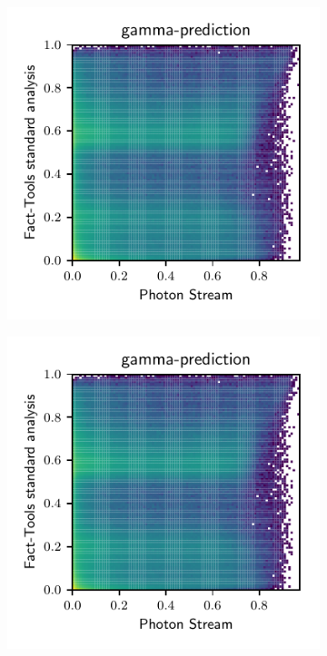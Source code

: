 %
%
\begin{figure}
  \begin{subfigure}{0.5\textwidth}
    \centering
    \includegraphics[width=\textwidth, page=1]{Plots/comparison_data_dl3.pdf}
  \end{subfigure}
  \begin{subfigure}{0.5\textwidth}
    \centering
    \includegraphics[width=\textwidth, page=2]{Plots/comparison_data_dl3.pdf}

\end{subfigure}
\end{figure}
